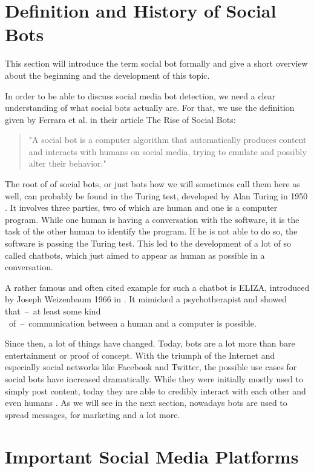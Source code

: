 \section{Definition and History of Social Bots} 
This section will introduce the term social bot formally and give a short overview about the beginning and the development of this topic.

In order to be able to discuss social media bot detection, we need a clear understanding of what social bots actually are.  For that, we use the definition given by Ferrara et al. in their article The Rise of Social Bots:
\begin{quote}
	"A social bot is a computer algorithm that automatically produces content and interacts with humans on social media, trying to emulate and possibly alter their behavior." \cite{ferrara15}
\end{quote}

The root of of social bots, or just bots how we will sometimes call them here as well, can probably be found in the Turing test, developed by Alan Turing in 1950 \cite{turing}. It involves three parties, two of which are human and one is a computer program. While one human is having a conversation with the software, it is the task of the other human to identify the program. If he is not able to do so, the software is passing the Turing test. This led to the development of a lot of so called chatbots, which just aimed to appear as human as possible in a conversation.  

A rather famous and often cited example for such a chatbot is ELIZA, introduced by Joseph Weizenbaum 1966 in \cite{eliza}. It mimicked a psychotherapist and showed \mbox{that -- at} least some kind\\ \mbox{ of -- communication} between a human and a computer is possible.

Since then, a lot of things have changed. Today, bots are a lot more than bare entertainment or proof of concept. With the triumph of the Internet and especially social networks like Facebook and Twitter, the possible use cases for social bots have increased dramatically. While they were initially mostly used to simply post content, today they are able to credibly interact with each other and even humans \cite{boshmaf13, hwang12}. As we will see in the next section, nowadays bots are used to spread messages, for marketing and a lot more.

\section{Important Social Media Platforms}

